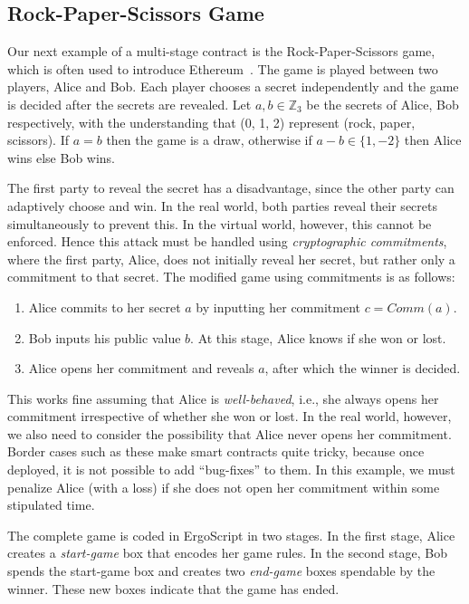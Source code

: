 \documentclass[runningheads]{llncs}
\newcommand{\langname}{ErgoScript\xspace}
\begin{document}
\subsection{Rock-Paper-Scissors Game}
\label{rps}

Our next example of a multi-stage contract is the Rock-Paper-Scissors game, which is often used to introduce Ethereum~\cite{rps15}.
The game is played between two players, Alice and Bob. Each player chooses a secret independently and the game is decided after the secrets are revealed. 
Let $a, b\in \mathbb{Z}_3$ be the secrets of Alice, Bob respectively, with the understanding that (0, 1, 2) represent (rock, paper, scissors). If $a = b$ then the game is a draw, otherwise if $a-b \in \{1, -2\}$ then Alice wins else Bob wins. 

The first party to reveal the secret has a disadvantage, since the other party can adaptively choose and win. In the real world, both parties reveal their secrets simultaneously to prevent this. In the virtual world, however, this cannot be enforced. Hence this attack must be handled using {\em cryptographic commitments}, where the first party, Alice, does not initially reveal her secret, but rather only a commitment to that secret. 
The modified game using commitments is as follows:

\begin{enumerate}
	\item Alice commits to her secret $a$ by inputting her commitment $c = Comm(a)$.
	\item Bob inputs his public value $b$. At this stage, Alice knows if she won or lost.
	\item Alice opens her commitment and reveals $a$, after which the winner is decided.
\end{enumerate}

This works fine assuming that Alice is {\em well-behaved}, i.e., she always opens her commitment irrespective of whether she won or lost. In the real world, however, we also need to consider the possibility that Alice never opens her commitment. 
Border cases such as these make smart contracts quite tricky, because once deployed, it is not possible to add ``bug-fixes'' to them. In this example, we must penalize Alice (with a loss) if she does not open her commitment within some stipulated time.

The complete game is coded in \langname in two stages. In the first stage, Alice creates a {\em start-game} box that encodes her game rules. In the second stage, Bob spends the start-game box and creates two {\em end-game} boxes spendable by the winner. These new boxes indicate that the game has ended.
\end{document}
